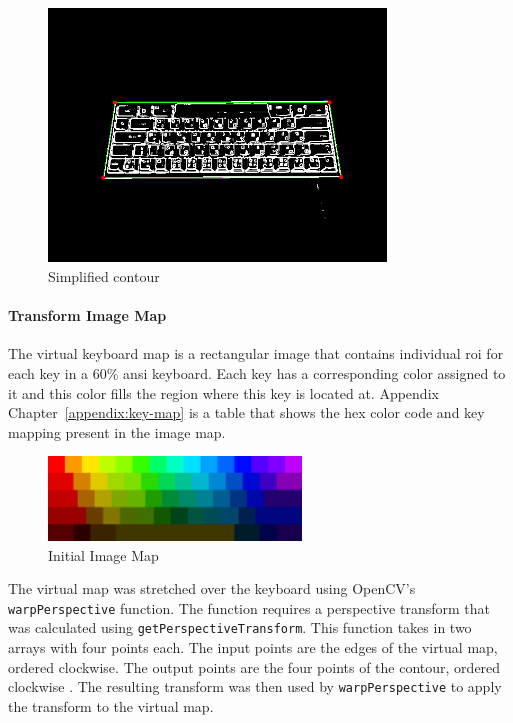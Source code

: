 \documentclass{report}
\begin{document}
\begin{figure}[H]
	\centering
	\includegraphics[width=0.8\textwidth]{get-largest-contour.png}
	\caption{Simplified contour}
	\centering
\end{figure}


\paragraph{Transform Image Map}
The virtual keyboard map is a rectangular image that contains individual
\ac{roi} for each key in a 60\% \ac{ansi} keyboard. Each key has a corresponding
color assigned to it and this color fills the region where this key is located
at. Appendix Chapter~\ref{appendix:key-map} is a table that shows the hex color
code and key mapping present in the image map.

\begin{figure}[H]
	\centering
	\includegraphics[width=0.6\textwidth]{image-map.png}
	\caption{Initial Image Map}
	\label{fig:metho-algo-key-map}
	\centering
\end{figure}

The virtual map was stretched over the keyboard using OpenCV's
\texttt{warpPerspective} function. The function requires a perspective transform
that was calculated using \texttt{getPerspectiveTransform}. This function takes
in two arrays with four points each. The input points are the edges of the
virtual map, ordered clockwise. The output points are the four points of the
contour, ordered clockwise \parencite{opencv-image-transform}. The resulting
transform was then used by \texttt{warpPerspective} to apply the transform to
the virtual map.
\end{document}
